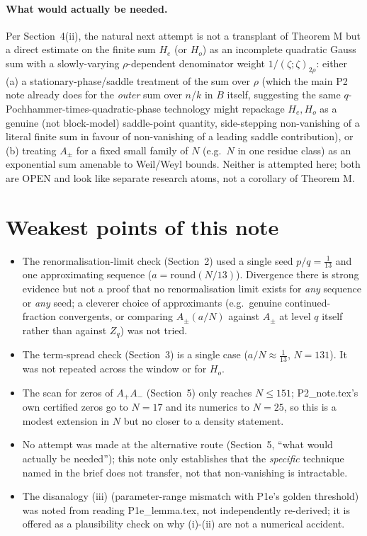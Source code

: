 \documentclass[11pt]{article}
\theoremstyle{remark}\newtheorem{remark}[theorem]{Remark}
\begin{document}
\paragraph{What would actually be needed.} Per Section~4(ii), the natural next attempt is not a transplant of Theorem M but a
direct estimate on the finite sum $H_e$ (or $H_o$) as an incomplete quadratic Gauss sum with a slowly-varying $\rho$-dependent
denominator weight $1/(\zeta;\zeta)_{2\rho}$: either (a) a stationary-phase/saddle treatment of the sum over $\rho$ (which the
main P2 note already does for the \emph{outer} sum over $n$/$k$ in $B$ itself, suggesting the same $q$-Pochhammer-times-quadratic-phase
technology might repackage $H_e,H_o$ as a genuine (not block-model) saddle-point quantity, side-stepping non-vanishing of a
literal finite sum in favour of non-vanishing of a leading saddle contribution), or (b) treating $A_\pm$ for a fixed small
family of $N$ (e.g.\ $N$ in one residue class) as an exponential sum amenable to Weil/Weyl bounds. Neither is attempted here;
both are OPEN and look like separate research atoms, not a corollary of Theorem M.

\section*{Weakest points of this note}
\begin{itemize}
\item The renormalisation-limit check (Section~2) used a single seed $p/q=\frac1{13}$ and one approximating sequence
($a=\mathrm{round}(N/13)$). Divergence there is strong evidence but not a proof that no renormalisation limit exists for
\emph{any} sequence or \emph{any} seed; a cleverer choice of approximants (e.g.\ genuine continued-fraction convergents, or
comparing $A_\pm(a/N)$ against $A_\pm$ at level $q$ itself rather than against $Z_q$) was not tried.
\item The term-spread check (Section~3) is a single case ($a/N\approx\frac1{13}$, $N=131$). It was not repeated across the
window or for $H_o$.
\item The scan for zeros of $A_+A_-$ (Section~5) only reaches $N\le151$; P2\_note.tex's own certified zeros go to $N=17$ and its
numerics to $N=25$, so this is a modest extension in $N$ but no closer to a density statement.
\item No attempt was made at the alternative route (Section~5, ``what would actually be needed''); this note only establishes
that the \emph{specific} technique named in the brief does not transfer, not that non-vanishing is intractable.
\item The disanalogy (iii) (parameter-range mismatch with P1e's golden threshold) was noted from reading P1e\_lemma.tex, not
independently re-derived; it is offered as a plausibility check on why (i)-(ii) are not a numerical accident.
\end{itemize}
\end{document}

